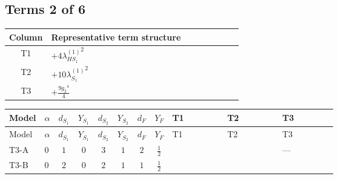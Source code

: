 \documentclass[8pt]{article}
\begin{document}
\begin{landscape}
\subsection*{Terms 2 of 6}
\begin{center}
\begin{tabular}{@{}c >{\raggedright\arraybackslash}p{0.82\linewidth}@{}}
\toprule
Column & Representative term structure \\
\midrule
T1 & \(\displaystyle +4 {\lambda_{HS_1}^{(1)}}^2\) \\
\midrule
T2 & \(\displaystyle +10 {\lambda_{S_1}^{(1)}}^2\) \\
\midrule
T3 & \(\displaystyle +\frac{9 {g_2}^4}{4}\) \\
\midrule
\bottomrule
\end{tabular}
\end{center}
\smallskip
\tiny
\begin{longtable}{@{}llcccccc >{\raggedright\arraybackslash}p{0.21\linewidth} >{\raggedright\arraybackslash}p{0.21\linewidth} >{\raggedright\arraybackslash}p{0.21\linewidth}@{}}
\toprule
Model & $\alpha$ & $d_{S_1}$ & $Y_{S_1}$ & $d_{S_2}$ & $Y_{S_2}$ & $d_F$ & $Y_F$ & T1 & T2 & T3 \\
\midrule
\endfirsthead
\toprule
Model & $\alpha$ & $d_{S_1}$ & $Y_{S_1}$ & $d_{S_2}$ & $Y_{S_2}$ & $d_F$ & $Y_F$ & T1 & T2 & T3 \\
\midrule
\endhead
T3-A & $0$ & $1$ & $0$ & $3$ & $1$ & $2$ & $\frac{1}{2}$ & \scriptsize\adjustbox{max width=\linewidth}{$\begin{gathered} +4 {\lambda_{HS_1}^{(1)}}^2\end{gathered}$} & \scriptsize\adjustbox{max width=\linewidth}{$\begin{gathered} +10 {\lambda_{S_1}^{(1)}}^2\end{gathered}$} & --- \\
\midrule
T3-B & $0$ & $2$ & $0$ & $2$ & $1$ & $1$ & $\frac{1}{2}$ & \scriptsize\adjustbox{max width=\linewidth}{$\begin{gathered} +4 {\lambda_{HS_1}^{(1)}}^2\end{gathered}$} & \scriptsize\adjustbox{max width=\linewidth}{$\begin{gathered} +12 {\lambda_{S_1}^{(1)}}^2\end{gathered}$} & \scriptsize\adjustbox{max width=\linewidth}{$\begin{gathered} +\frac{9 {g_2}^4}{4}\end{gathered}$} \\
\midrule

\end{longtable}
\end{landscape}
\end{document}
